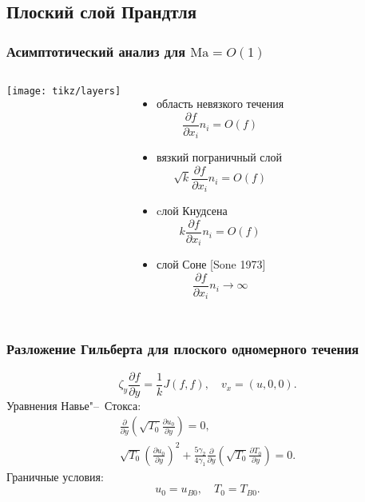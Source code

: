 \documentclass[mathserif]{beamer} %
\newcommand{\Ma}{\mathrm{Ma}}
\newcommand{\pder}[2][]{\frac{\partial#1}{\partial#2}}
\newcommand{\OO}[1]{O(#1)}
\begin{document}
\subsection{Плоский слой Прандтля}

\begin{frame}
    \frametitle{Асимптотический анализ для \(\Ma = \OO{1}\)}
   	\begin{columns}
		\begin{center}
		    \vspace{-27pt}
			\texttt{[image: tikz/layers]}
		\end{center}
		\vspace{-10pt}
		\begin{itemize}
			\item область невязкого течения \[ \pder[f]{x_i}n_i = \OO{f} \]
			\item вязкий пограничный слой \[ \sqrt{k}\pder[f]{x_i}n_i = \OO{f} \]
			\item cлой Кнудсена \[ k\pder[f]{x_i}n_i = \OO{f} \]
			\item слой Соне [Sone 1973] \[ \pder[f]{x_i}n_i \to \infty \]
		\end{itemize}
	\end{columns}
\end{frame}

\begin{frame}
    \frametitle{Разложение Гильберта для плоского одномерного течения}
    \begin{equation}\label{eq:Hilbert_plane_1d}
        \zeta_y\pder[f]{y} = \frac1k J(f,f), \quad v_x = (u, 0, 0).
    \end{equation}
    \pause
    Уравнения Навье"--~Стокса:
    \begin{gather}
        \pder{y}\left( \sqrt{T_0}\pder[u_0]{y} \right) = 0, \\
        \sqrt{T_0}\left( \pder[u_0]{y}\right)^2 + \frac{5\gamma_2}{4\gamma_1}\pder{y}\left(\sqrt{T_0}\pder[T_0]{y} \right) = 0.
    \end{gather}
    Граничные условия:
    \begin{equation}
        u_0 = u_{B0}, \quad T_0 = T_{B0}.
    \end{equation}
\end{frame}
\end{document}
